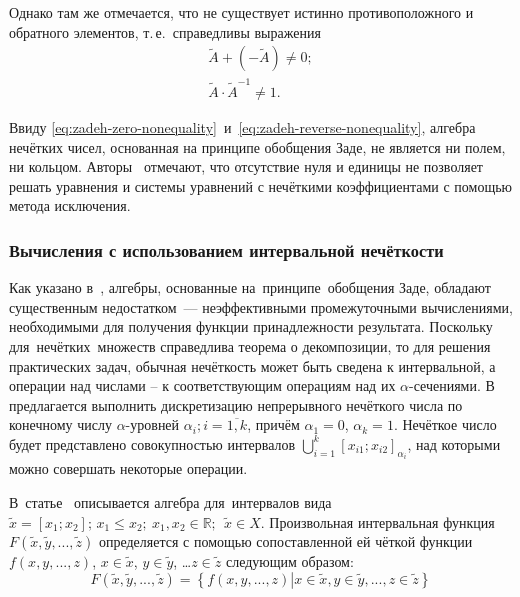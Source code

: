 Однако там же отмечается, что не существует истинно противоположного и обратного элементов, т.\,е.~справедливы выражения
\begin{gather}
	\label{eq:zadeh-zero-nonequality}
	\tilde{A}+\left( -\tilde{A} \right)\ne 0; \\
	\label{eq:zadeh-reverse-nonequality}
	\tilde{A}\cdot {{\tilde{A}}^{-1}}\ne 1.
\end{gather}

Ввиду \eqref{eq:zadeh-zero-nonequality}~и~\eqref{eq:zadeh-reverse-nonequality}, алгебра нечётких чисел, основанная на принципе обобщения Заде, не является ни полем, ни кольцом. Авторы~\cite{Rutkovskaya} отмечают, что отсутствие нуля и единицы не позволяет решать уравнения и системы уравнений с нечёткими коэффициентами с помощью метода исключения.

\subsubsection*{Вычисления с использованием интервальной нечёткости}
Как указано в~\cite{Rotshtein, Borisov_Krumberg_Riga}, алгебры, основанные на~принципе~обобщения Заде, обладают существенным недостатком~--- неэффективными промежуточными вычислениями, необходимыми для получения функции принадлежности результата. Поскольку для~нечётких~множеств справедлива теорема о декомпозиции, то для решения практических задач, обычная нечёткость может быть сведена к интервальной, а операции над числами – к соответствующим операциям над их $\alpha$-сечениями. В~\cite{Borisov_Krumberg_Riga} предлагается выполнить дискретизацию непрерывного нечёткого числа по конечному числу $\alpha$-уровней $\alpha_i;i=\overline{1,k}$, причём $\alpha_1=0$, $\alpha_k=1$. Нечёткое число будет представлено совокупностью интервалов $\displaystyle \bigcup\limits_{i=1}^{k}{{{\left[ {{x}_{i1}};{{x}_{i2}} \right]}_{{{\alpha }_{i}}}}}$, над которыми можно совершать некоторые операции.

В~статье~\cite{Levin} описывается алгебра для~интервалов вида $\tilde{x}=\left[ {{x}_{1}};{{x}_{2}} \right];\,{{x}_{1}}\le {{x}_{2}};\ {{x}_{1}},{{x}_{2}}\in \mathbb{R};\ \ \tilde{x}\in X$. Произвольная интервальная функция $F\left( \tilde{x},\tilde{y},...,\tilde{z} \right)$ определяется с помощью сопоставленной ей чёткой функции $f\left( x,y,...,z \right)$, $x\in \tilde{x}$, $y\in \tilde{y}$, …$z\in \tilde{z}$ следующим образом:
\begin{equation}
\label{eq:interval-function}
	F\left( \tilde{x},\tilde{y},...,\tilde{z} \right)=\left\{ f\left( x,y,...,z \right)\left| x\in \tilde{x},y\in \tilde{y},...,z\in \tilde{z} \right. \right\}
\end{equation}

